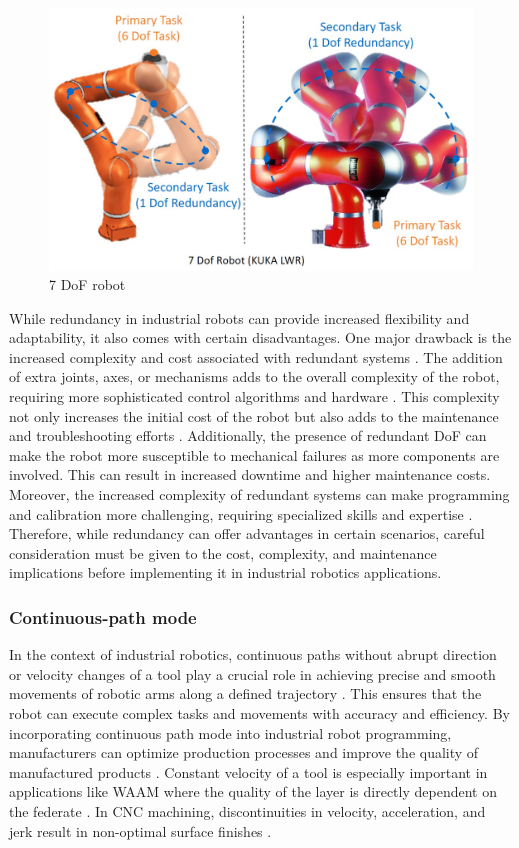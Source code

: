 \begin{figure}[H]
	\centerline{\includegraphics[scale=.14]{figures/red.png}}
	\caption{7 DoF robot \cite{Hagane.2022}}
	\label{seven}
\end{figure}



While redundancy in industrial robots can provide increased flexibility and adaptability, it also comes with certain disadvantages. One major drawback is the increased complexity and cost associated with redundant systems \cite{Halevi.2011}. The addition of extra joints, axes, or mechanisms adds to the overall complexity of the robot, requiring more sophisticated control algorithms and hardware \cite{Duong.2021}. This complexity not only increases the initial cost of the robot but also adds to the maintenance and troubleshooting efforts \cite{Ahangar.2019}. Additionally, the presence of redundant DoF can make the robot more susceptible to mechanical failures as more components are involved. This can result in increased downtime and higher maintenance costs. Moreover, the increased complexity of redundant systems can make programming and calibration more challenging, requiring specialized skills and expertise \cite{Erdos.2016}. Therefore, while redundancy can offer advantages in certain scenarios, careful consideration must be given to the cost, complexity, and maintenance implications before implementing it in industrial robotics applications.




\subsubsection{Continuous-path mode}
In the context of industrial robotics, continuous paths without abrupt direction or velocity changes of a tool play a crucial role in achieving precise and smooth movements of robotic arms along a defined trajectory \cite{Jia.2018}. This ensures that the robot can execute complex tasks and movements with accuracy and efficiency. By incorporating continuous path mode into industrial robot programming, manufacturers can optimize production processes and improve the quality of manufactured products \cite{Zhang.2020}. Constant velocity of a tool is especially important in applications like WAAM where the quality of the layer is directly dependent on the federate \cite{Li.2018b}. In CNC machining, discontinuities in velocity, acceleration, and jerk result in non-optimal surface finishes \cite{Sun.2021}.


